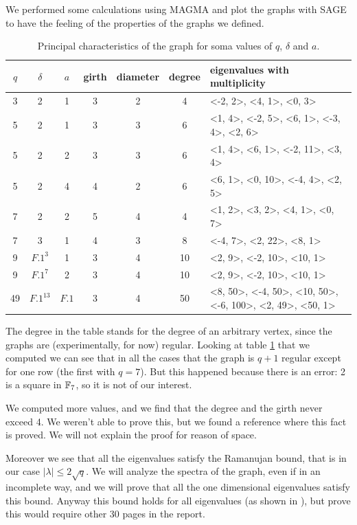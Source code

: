 We performed some calculations using MAGMA and plot the graphs with SAGE to have the feeling of the properties of the
graphs we defined.

\begin{table}\centering
\begin{tabular}{|c|c|c|c|c|c| p{4.2cm} |}
\hline
$q$ & $\delta$ & $a$ & girth & diameter & degree & eigenvalues with multiplicity \\
\hline
3 & 2 & 1 & 3 & 2 & 4 & <-2, 2>, <4, 1>, <0, 3>\\
5 & 2 & 1 & 3 & 3 & 6 & <1, 4>, <-2, 5>, <6, 1>, <-3, 4>, <2, 6>\\
5 & 2 & 2 & 3 & 3 & 6 & <1, 4>, <6, 1>, <-2, 11>, <3, 4>\\
5 & 2 & 4 & 4 & 2 & 6 & <6, 1>, <0, 10>, <-4, 4>, <2, 5>\\
7 & 2 & 2 & 5 & 4 & 4 & <1, 2>, <3, 2>, <4, 1>, <0, 7>\\
7 & 3 & 1 & 4 & 3 & 8 & <-4, 7>, <2, 22>, <8, 1>\\
9 & $F.1^3$ & 1 & 3 & 4 & 10 & <2, 9>, <-2, 10>, <10, 1>\\
9 & $F.1^7$ & 2 & 3 & 4 & 10 & <2, 9>, <-2, 10>, <10, 1>\\
49 & $F.1^13$ & $F.1$ & 3 & 4 & 50 & <8, 50>, <-4, 50>, <10, 50>, <-6, 100>, <2, 49>, <50, 1>\\
\hline
\end{tabular}
\caption{Principal characteristics of the graph for soma values of $q$, $\delta$ and $a$.}\label{tab}
\end{table}
The degree in the table stands for the degree of an arbitrary vertex, since the graphs are (experimentally, for now) regular.
Looking at table \ref{tab} that we computed we can see that in all the cases that the graph is $q+1$ regular except for
one row (the first with $q=7$). But this happened because there is an error: 2 is a square in ${\mathbb F}_7$, so it is not of our interest.

We computed more values, and we find that the degree and the girth never exceed 4. We weren't able to prove this, but we found
a reference \cite{ANGEL199662} where this fact is proved. We will not explain the proof for reason of space.

Moreover we see that all the eigenvalues satisfy the Ramanujan bound, that is in our case $\vert \lambda \vert \le 2\sqrt{q}$.
We will analyze the spectra of the graph, even if in an incomplete way, and we will prove that all the one dimensional
eigenvalues satisfy this bound. Anyway this bound holds for all eigenvalues (as shown in \cite{terras_1999}),
but prove this would require other 30 pages in the report.

